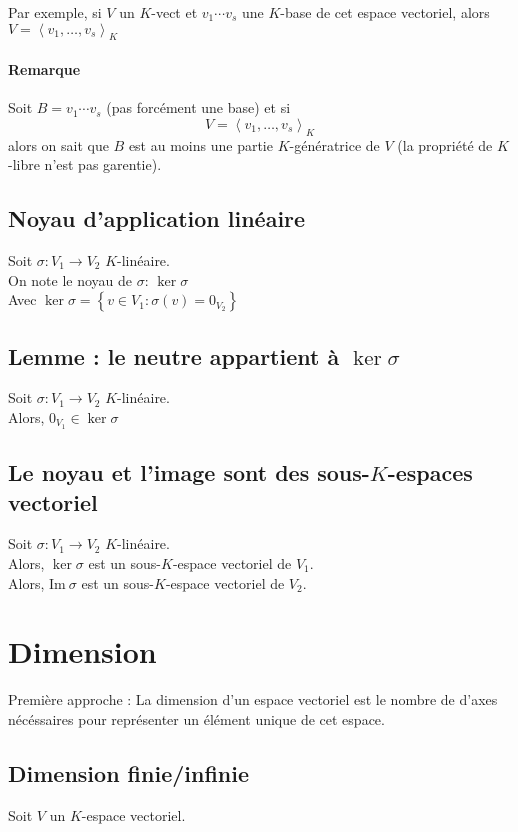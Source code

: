 \documentclass[a4paper,10pt]{article}
\newcommand{\ap}{ \rightarrow} %
\newcommand{\grp}[1]{\left\langle #1 \right\rangle} %
\newcommand{\set}[1]{\left\lbrace #1 \right\rbrace } %
\newcommand{\im}{\mathrm{Im}\:} %
\begin{document}
   Par exemple, si $V$ un $K$-vect et $v_1 \cdots v_s$ une $K$-base de cet espace vectoriel, alors $V=\grp{v_1, \hdots, v_s}_K$

   \paragraph{Remarque} Soit $B = v_1 \cdots v_s$ (pas forcément une base) et si $$V = \grp{v_1, \hdots, v_s}_K$$
   alors on sait que $B$ est au moins une partie $K$-génératrice de $V$ (la propriété de $K$-libre n'est pas garentie).

  \subsection{Noyau d'application linéaire}
   Soit $\sigma : V_1 \ap V_2$ $K$-linéaire.\\
   On note le \flqq noyau de $\sigma$\frqq : \flqq$\ker \sigma$\frqq\\
   Avec $\ker \sigma = \set{v \in V_1 : \sigma(v)=0_{V_2}}$

  \subsection{Lemme : le neutre appartient à $\ker \sigma$}
   Soit $\sigma : V_1 \ap V_2$ $K$-linéaire.\\
   Alors, $0_{V_1} \in \ker \sigma$

  \subsection{Le noyau et l'image sont des sous-$K$-espaces vectoriel}
   Soit $\sigma : V_1 \ap V_2$ $K$-linéaire.\\
   Alors, $\ker \sigma$ est un sous-$K$-espace vectoriel de $V_1$.\\
   Alors, $\im \sigma$ est un sous-$K$-espace vectoriel de $V_2$.

 \section{Dimension}
  Première approche : La dimension d'un espace vectoriel est le nombre de d'axes nécéssaires pour représenter un élément unique de cet espace.

  \subsection{Dimension finie/infinie}
   Soit $V$ un $K$-espace vectoriel.
\end{document}

